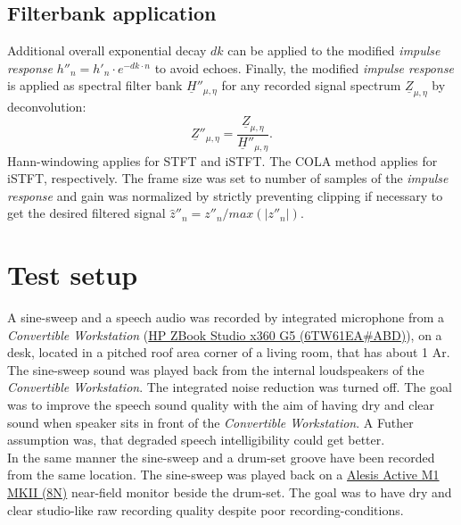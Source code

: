 \documentclass{article}
\begin{document}
\subsection{Filterbank application}
Additional overall exponential decay $dk$ can be applied to the modified \textit{impulse response} $h''_n= h'_n \cdot e^{-dk \cdot n}$ to avoid echoes. Finally, the modified \textit{impulse response} is applied as spectral filter bank $\underline{H}''_{\mu,\eta}$ for any recorded signal spectrum $\underline{Z}_{\mu,\eta}$ by deconvolution:
\begin{equation}
\underline{Z}''_{\mu,\eta}=\frac{\underline{Z}_{\mu,\eta}}{\underline{H}''_{\mu,\eta}}. \label{eq:system}
\end{equation}
Hann-windowing applies for STFT and iSTFT. The COLA method applies for iSTFT, respectively. The frame size was set to number of samples of the \textit{impulse response} and gain was normalized by strictly preventing clipping if necessary to get the desired filtered signal $\hat{z}''_{n} = z''_{n}  / max(|z''_{n}|)$.

\section{Test setup}

A sine-sweep and a speech audio was recorded by integrated microphone from a \textit{Convertible Workstation}
(\href{https://web.archive.org/web/20201031164451/https://h20195.www2.hp.com/v2/GetDocument.aspx?docname=c05939925}{HP ZBook Studio x360 G5 (6TW61EA\#ABD)}), on a desk, located in a pitched roof area corner of a living room, that has about 1 Ar. The sine-sweep sound was played back from the internal loudspeakers of the \textit{Convertible Workstation}. The integrated noise reduction was turned off. The goal was to improve the speech sound quality with the aim of having dry and clear sound when speaker sits in front of the \textit{Convertible Workstation}. A Futher assumption was, that degraded speech intelligibility could get better. \\ 

In the same manner the sine-sweep and a drum-set groove have been recorded from the same location. The sine-sweep was played back on a \href{https://ia601909.us.archive.org/31/items/manualsbase-id-372739/372739.pdf}{Alesis Active M1 MKII (8N)} near-field monitor beside the drum-set. The goal was to have dry and clear studio-like raw recording quality despite poor recording-conditions.
\end{document}
